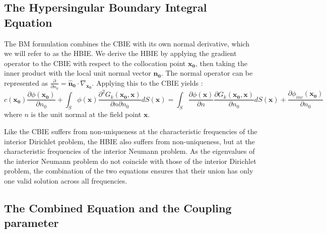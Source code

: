 \subsection{The Hypersingular Boundary Integral Equation} \label{subsec:bm-hbie}
The \ac{BM} formulation combines the \ac{CBIE} with its own normal derivative, which we will refer to as the \ac{HBIE}. We derive the \ac{HBIE} by applying the gradient operator to the \ac{CBIE} with respect to the collocation point $\mathbf{x_0}$, then taking the inner product with the local unit normal vector $\mathbf{\hat{n}_0}$.
The normal operator can be represented as $ \frac{\partial}{\partial n_0} = \mathbf{\hat{n}_0} \cdot \nabla_{\mathbf{x_0}}$.
Applying this to the \ac{CBIE} yields :
\begin{equation}
    c(\mathbf{x_0})\frac{\partial \phi(\mathbf{x_0})}{\partial n_0} + \int_S \phi(\mathbf{x}) \frac{\partial^2 G_k(\mathbf{x_0}, \mathbf{x})}{\partial n \partial n_0} dS(\mathbf{x}) = \int_S \frac{\partial \phi(\mathbf{x})}{\partial n} \frac{\partial G_k(\mathbf{x_0}, \mathbf{x})}{\partial n_0} dS(\mathbf{x}) + \frac{\partial \phi_{inc}(\mathbf{x_0})}{\partial n_0}
\end{equation}
where $n$ is the unit normal at the field point $\mathbf{x}$.

Like the \ac{CBIE} suffers from non-uniqueness at the characteristic frequencies of the interior Dirichlet problem, the \ac{HBIE} also suffers from non-uniqueness, but at the characteristic frequencies of the interior Neumann problem. As the eigenvalues of the interior Neumann problem do not coincide with those of the interior Dirichlet problem, the combination of the two equations ensures that their union has only one valid solution across all frequencies.

\subsection{The Combined Equation and the Coupling parameter} \label{subsec:bm-combined}

